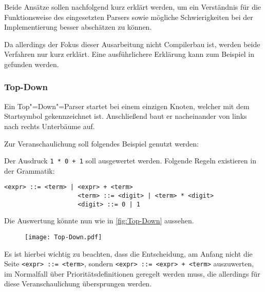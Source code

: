             Beide Ansätze sollen nachfolgend kurz erklärt werden,
            um ein Verständnis für die Funktionsweise des eingesetzten Parsers sowie
            mögliche Schwierigkeiten bei der Implementierung besser abschätzen zu können.

            Da allerdings der Fokus dieser Ausarbeitung nicht Compilerbau ist,
            werden beide Verfahren nur kurz erklärt.
            Eine ausführlichere Erklärung kann zum Beispiel in
            \cite[77]{Watson2017} gefunden werden.

            \subsubsection{Top-Down}\label{Top-Down}
                Ein Top"=Down"=Parser startet bei einem einzigen Knoten,
                welcher mit dem Startsymbol gekennzeichnet ist.
                Anschließend baut er nacheinander von links nach rechts Unterbäume auf.

                Zur Veranschaulichung soll folgendes Beispiel genutzt werden:

                Der Ausdruck
                \verb|1 * 0 + 1| soll ausgewertet werden.
                Folgende Regeln existieren in der Grammatik:

                \begin{lstlisting}[caption={Grammatik einer einfachen arithmetischen Sprache}, gobble=20]
                    <expr> ::= <term> | <expr> + <term>
                    <term> ::= <digit> | <term> * <digit>
                    <digit> ::= 0 | 1
                \end{lstlisting}
                Die Auswertung könnte nun wie in \vref{fig:Top-Down} aussehen.

                \begin{figure}[htp]
                    \centering%
                    \texttt{[image: Top-Down.pdf]}
                    \label{fig:Top-Down}
                \end{figure}

                Es ist hierbei wichtig zu beachten,
                dass die Entscheidung,
                am Anfang nicht die Seite
                \lstinline{<expr> ::= <term>},
                sondern
                \lstinline{<expr> ::= <expr> + <term>} auszuwerten,
                im Normalfall über Prioritätsdefinitionen geregelt werden muss,
                die allerdings für diese Veranschaulichung übersprungen werden.

